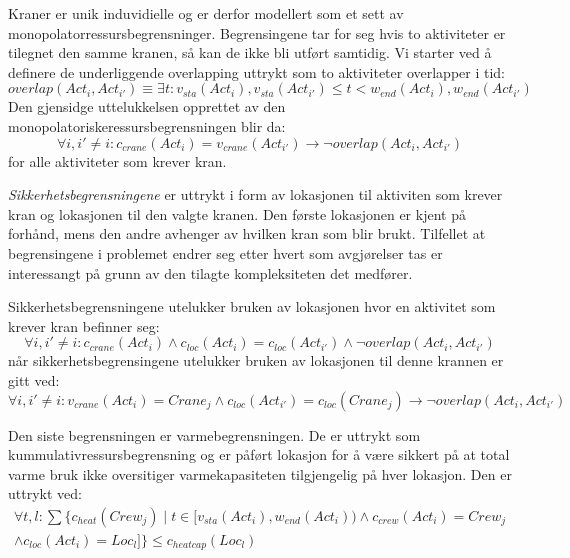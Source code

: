 Kraner er unik induvidielle og er derfor modellert som et sett av monopolatorressursbegrensninger. Begrensingene tar for seg hvis to aktiviteter er tilegnet den samme kranen, så kan de ikke bli utført samtidig. Vi starter ved å definere de underliggende overlapping uttrykt som to aktiviteter overlapper i tid: 
\begin{equation}
overlap(Act_{i},Act_{i'}) \equiv \exists t : v_{sta}(Act_{i}),v_{sta}(Act_{i'}) \leq t < w_{end}(Act_{i}),w_{end}(Act_{i'})
\end{equation}
Den gjensidge uttelukkelsen opprettet av den monopolatoriskeressursbegrensningen blir da: 
\begin{equation}
\forall i,i' \neq i : c_{crane}(Act_{i}) = v_{crane}(Act_{i'}) \rightarrow \neg overlap(Act_{i},Act_{i'})
\end{equation}
for alle aktiviteter som krever kran.

\textit{Sikkerhetsbegrensningene} er uttrykt i form av lokasjonen til aktiviten som krever kran og lokasjonen til den valgte kranen. Den første lokasjonen er kjent på forhånd, mens den andre avhenger av hvilken kran som blir brukt. Tilfellet at begrensingene i problemet endrer seg etter hvert som avgjørelser tas er interessangt på grunn av den tilagte kompleksiteten det medfører.

Sikkerhetsbegrensningene utelukker bruken av lokasjonen hvor en aktivitet som krever kran befinner seg:
\begin{equation}
\forall i,i' \neq i : c_{crane}(Act_{i}) \wedge c_{loc}(Act_{i}) = c_{loc}(Act_{i'}) \wedge \neg overlap(Act_{i},Act_{i'})
\end{equation}
når sikkerhetsbegrensingene utelukker bruken av lokasjonen til denne krannen er gitt ved:
\begin{equation}
\forall i,i' \neq i : v_{crane}(Act_{i}) = Crane_{j} \wedge c_{loc}(Act_{i'}) = c_{loc}(Crane_{j}) \rightarrow \neg overlap(Act_{i},Act_{i'})
\end{equation}

Den siste begrensningen er varmebegrensningen. De er uttrykt som kummulativressursbegrensning og er påført lokasjon for å være sikkert på at total varme bruk ikke oversitiger varmekapasiteten tilgjengelig på hver lokasjon. Den er uttrykt ved:
\begin{equation}
\begin{split}
\forall t,l: \sum\{c_{heat}(Crew_j) \mid t \in [ v_{sta}(Act_{i}), w_{end}(Act_{i})) \wedge c_{crew}(Act_{i}) = Crew_{j} \\
\wedge c_{loc}(Act_{i}) = Loc_{l} ] \} \le c_{heatcap}(Loc_{l})
\end{split}
\end{equation}

